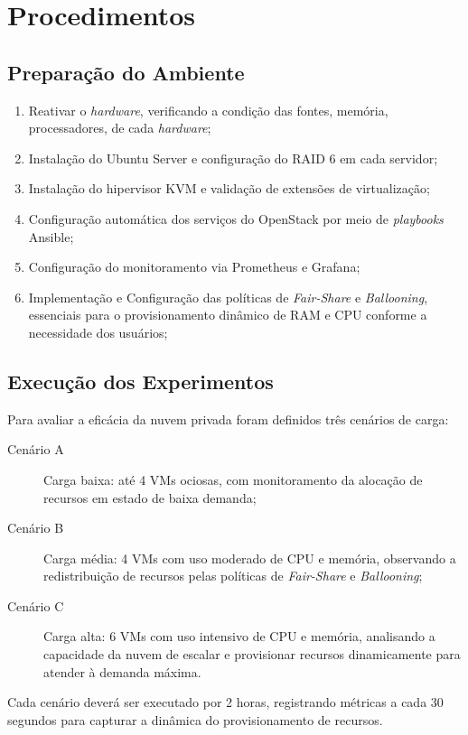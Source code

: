 \section{Procedimentos}
\subsection{Preparação do Ambiente}
\begin{enumerate}
    \item Reativar o \textit{hardware}, verificando a condição das fontes, memória, processadores, de cada \textit{hardware};
    \item Instalação do Ubuntu Server e configuração do RAID 6 em cada servidor;
    \item Instalação do hipervisor KVM e validação de extensões de virtualização;
    \item Configuração automática dos serviços do OpenStack por meio de \textit{playbooks} Ansible;
    \item Configuração do monitoramento via Prometheus e Grafana;
    \item Implementação e Configuração das políticas de \textit{Fair-Share} e \textit{Ballooning}, essenciais para o provisionamento dinâmico de RAM e CPU conforme a necessidade dos usuários;
\end{enumerate}

\subsection{Execução dos Experimentos}
Para avaliar a eficácia da nuvem privada foram definidos três cenários de carga:
\begin{description}
    \item[Cenário A] Carga baixa: até 4 VMs ociosas, com monitoramento da alocação de recursos em estado de baixa demanda;
    \item[Cenário B] Carga média: 4 VMs com uso moderado de CPU e memória, observando a redistribuição de recursos pelas políticas de \textit{Fair-Share} e \textit{Ballooning};
    \item[Cenário C] Carga alta: 6 VMs com uso intensivo de CPU e memória, analisando a capacidade da nuvem de escalar e provisionar recursos dinamicamente para atender à demanda máxima.
\end{description}
Cada cenário deverá ser executado por 2 horas, registrando métricas a cada 30 segundos para capturar a dinâmica do provisionamento de recursos.

